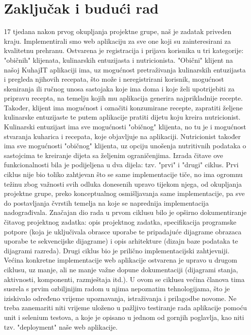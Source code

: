 \chapter{Zaključak i budući rad}
		
		17 tjedana nakon prvog okupljanja projektne grupe, naš je zadatak priveden kraju. Implementirali smo web aplikaciju za sve one koji su zainteresirani za kvalitetnu prehranu. Ostvarena je registracija i prijava korisnika u tri kategorije: "običnih" klijenata, kulinarskih entuzijasta i nutricionista. 
		"Obični" klijent na našoj KuhajIT aplikaciji ima, uz mogućnost pretraživanja kulinarskih entuzijasta i pregleda njihovih recepata, što može i neregistrirani korisnik, mogućnost skeniranja ili ručnog unosa sastojaka koje ima doma i koje želi upotrijebiti za pripravu recepta, na temelju kojih mu aplikacija generira najprikladnije recepte. Također, klijent ima mogućnost i označiti konzumirane recepte, zapratiti željene kulinarske entuzijaste te putem aplikacije pratiti dijetu koju kreira nutricionist.
		Kulinarski entuzijast ima sve mogućnosti "običnog" klijenta, no tu je i mogućnost stvaranja kuharica i recepata, koje objavljuje na aplikaciji. 
		Nutricionist također ima sve mogućnosti "običnog" klijenta, uz opciju unošenja nutritivnih podataka o sastojcima te kreiranje dijeta sa željenim ograničenjima.
		Izrada čitave ove funkcionalnosti bila je podijeljena u dva dijela: tzv. "prvi" i "drugi" ciklus.
		Prvi ciklus nije bio toliko zahtjevan što se same implementacije tiče, no ima ogromnu težinu zbog važnosti svih odluka donesenih upravo tijekom njega, od okupljanja projektne grupe, preko konceptualnog osmišljavanja same implementacije, pa sve do postavljanja čvrstih temelja na koje se naprednija implementacija nadograđivala. Značajan dio rada u prvom ciklusu bilo je opširno dokumentiranje čitavog projektnog zadatka: opis projektnog zadatka, specifikacija programske potpore (koja je uključivala obrasce uporabe te pripadajuće dijagrame obrazaca uporabe te sekvencijske dijagrame) i opis arhitekture (dizajn baze podataka te dijagrami razreda). 
		Drugi ciklus bio je prilično implementacijski zahtjevniji. Većina konkretne implementacije web aplikacije ostvarena je upravo u drugom ciklusu, uz manje, ali ne manje važne dopune dokumentaciji (dijagrami stanja, aktivnosti, komponenti, razmještaja itd.). U ovom se ciklusu većina članova tima susrela s prvim ozbiljnijim radom u njima nepoznatim tehnologijama, što je iziskivalo određeno vrijeme upoznavanja, istraživanja i prilagodbe novome. Ne treba zanemariti niti vrijeme uloženo u pažljivo testiranje rada aplikacije pomoću unit i selenium testova, a koje je opisano u jednom od gornjih poglavlja, kao niti tzv. "deployment" naše web aplikacije.
